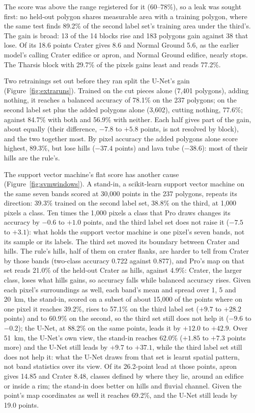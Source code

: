 \documentclass[twocolumn]{aastex701}
\begin{document}
The score was above the range registered for it (60--78\%), so a leak was sought first: no held-out polygon shares
measurable area with a training polygon, where the same test finds 89.2\% of the second label set's training area under
the third's. The gain is broad: 13 of the 14 blocks rise and 183 polygons gain against 38 that lose. Of its 18.6
points Crater gives 8.6 and Normal Ground 5.6, as the earlier model's calling Crater edifice or apron, and Normal Ground
edifice, nearly stops. The Tharsis block with 29.7\% of the pixels gains least and reads 77.2\%. %

Two retrainings set out before they ran split the U-Net's gain (Figure~\ref{fig:extraruns}). Trained on the cut pieces alone (7,401 polygons),
adding nothing, it reaches a balanced accuracy of 78.1\% on the 237 polygons; on the second label set plus the added
polygons alone (3,602), cutting nothing, 77.6\%; against 84.7\% with both and 56.9\% with neither. Each half gives
part of the gain, about equally (their difference, $-7.8$ to $+5.8$ points, is not resolved by block), and the two
together most. By pixel accuracy the added polygons alone score highest, 89.3\%, but lose hills ($-37.4$ points) and
lava tube ($-38.6$): most of their hills are the rule's. %

The support vector machine's flat score has another cause (Figure~\ref{fig:svmwindows}). A stand-in, a scikit-learn support vector machine on the
same seven bands scored at 30,000 points in the 237 polygons, repeats its direction: 39.3\% trained on the second
label set, 38.8\% on the third, at 1,000 pixels a class. Ten times the 1,000 pixels a class that Pro draws changes its
accuracy by $-0.6$ to $+1.0$ points, and the third label set does not raise it ($-7.5$ to $+3.1$): what holds the
support vector machine is one pixel's seven bands, not its sample or its labels. The third set moved its boundary
between Crater and hills. The rule's hills, half of them on crater flanks, are harder to tell from Crater by those
bands (two-class accuracy 0.722 against 0.877), and Pro's map on that set reads 21.0\% of the held-out Crater as
hills, against 4.9\%: Crater, the larger class, loses what hills gains, so accuracy falls while balanced accuracy
rises. Given each pixel's surroundings as well, each band's mean and spread over 1, 5 and 20~km, the stand-in, scored
on a subset of about 15,000 of the points where on one pixel it reaches 39.2\%, rises to 57.1\% on the third label set ($+9.7$ to $+28.2$ points) and to 60.9\% on the second, so the third
set still does not help it ($-9.6$ to $-0.2$); the U-Net, at 88.2\% on the same points, leads it by $+12.0$ to
$+42.9$. Over 51~km, the U-Net's own view, the stand-in reaches 62.0\% ($+1.85$ to $+7.3$ points more) and the
U-Net still leads by $+9.7$ to $+37.1$, while the third label set still does not help it: what the U-Net draws
from that set is learnt spatial pattern, not band statistics over its view. Of its 26.2-point lead at those points,
apron gives 14.85 and Crater 8.48, classes defined by where they lie, around an edifice or inside a rim; the
stand-in does better on hills and fluvial channel. Given the point's map coordinates as well it reaches 69.2\%,
and the U-Net still leads by 19.0 points. %
\end{document}
